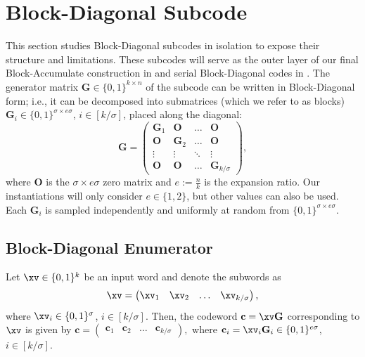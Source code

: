 \section{Block-Diagonal Subcode}\label{sec:block}

This section studies Block-Diagonal subcodes in isolation to expose their structure and limitations. These subcodes will serve as the outer layer of our final Block-Accumulate construction in  and serial Block-Diagonal codes in .
The generator matrix $\mathbf{G} \in \{0,1\}^{k \times n}$ of the subcode can be written in Block-Diagonal form; i.e., it can be decomposed into submatrices (which we refer to as blocks) $\mathbf{G}_i \in \{0,1\}^{\sigma\times e\sigma}$, $i \in [k/ \sigma]$, placed along the diagonal:
$$
    \mathbf{G} = \left(\begin{matrix}\mathbf{G}_1 & \mathbf{O} &\ldots&\mathbf{O}\\\mathbf{O} &\mathbf{G}_2 & \ldots&\mathbf{O}\\\vdots & \vdots &\ddots&\vdots\\\mathbf{O} & \mathbf{O} &\ldots&\mathbf{G}_{k/\sigma}\end{matrix}\right),
$$
where $\mathbf{O}$ is the $\sigma\times e\sigma$ zero matrix and $e := \frac{n}{k}$ is the expansion ratio. Our instantiations will only consider $e\in \{1,2\}$, but other values can also be used. Each $\mathbf{G}_i$ is sampled independently and uniformly at random from $\{0,1\}^{\sigma \times e\sigma}$. %

\subsection{Block-Diagonal Enumerator}
Let $\xv \in \{0,1\}^k$ be an input word and denote the subwords as
$$
    \xv = \left(\begin{matrix}\xv_1 & \xv_2 &\ldots&\xv_{k/\sigma}\end{matrix}\right),
$$
where $\xv_i \in \{0,1\}^{\sigma}$, $i \in [k/ \sigma]$. Then, the codeword $\mathbf{c}=\xv\mathbf{G}$ corresponding to $\xv$ is given by
$
    \mathbf{c} = \left(\begin{matrix}\mathbf{c}_1 & \mathbf{c}_2 &\ldots&\mathbf{c}_{k/\sigma}\end{matrix}\right),
$
where $\mathbf{c}_i = \xv_i\mathbf{G}_i\in \{0,1\}^{e\sigma}$, $i \in [k/ \sigma]$. 


